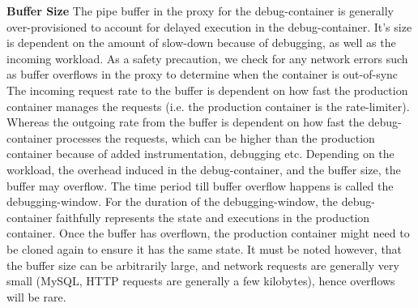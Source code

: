 \textbf{Buffer Size } 
The pipe buffer in the proxy for the debug-container is generally over-provisioned to account for delayed execution in the debug-container. 
It's size is dependent on the amount of slow-down because of debugging, as well as the incoming workload.
As a safety precaution, we check for any network errors such as buffer overflows in the proxy to determine when the container is out-of-sync 
The incoming request rate to the buffer is dependent on how fast the production container manages the requests (i.e. the production container is the rate-limiter).
Whereas the outgoing rate from the buffer is dependent on how fast the debug-container processes the requests, which can be higher than the production container because of added instrumentation, debugging etc.
Depending on the workload, the overhead induced in the debug-container, and the buffer size, the buffer may overflow.
The time period till buffer overflow happens is called the debugging-window.
For the duration of the debugging-window, the debug-container faithfully represents the state and executions in the production container. 
Once the buffer has overflown, the production container might need to be cloned again to ensure it has the same state.
It must be noted however, that the buffer size can be arbitrarily large, and network requests are generally very small (MySQL, HTTP requests are generally a few kilobytes), hence overflows will be rare.
 

